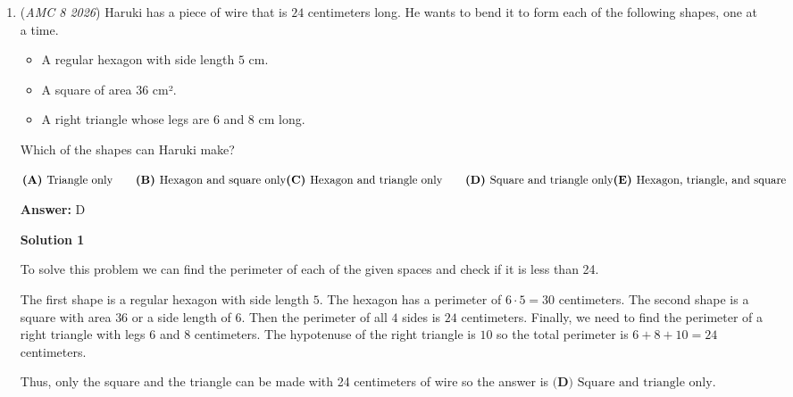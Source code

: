 \begin{enumerate}
 I suggest you try this with more arrays to possibly come up with an easier formula.

 


	\item (\textit{AMC 8 2026}) Haruki has a piece of wire that is $24$ centimeters long. He wants to bend it to form each of the following shapes, one at a time.


 
            \begin{itemize}
        \item A regular hexagon with side length $5$ cm.
            \end{itemize}
            
            \begin{itemize}
        \item A square of area $36$ cm².
            \end{itemize}
            
            \begin{itemize}
        \item A right triangle whose legs are $6$ and $8$ cm long.
            \end{itemize}
            Which of the shapes can Haruki make?


 $\textbf{(A) }\text{Triangle only} \qquad \textbf{(B) }\text{Hexagon and square only} \\  \textbf{(C) }\text{Hexagon and triangle only} \qquad \textbf{(D) }\text{Square and triangle only} \\ \textbf{(E) }\text{Hexagon, triangle, and square}$

 \textbf{Answer: }D



\textbf{Solution 1}

	To solve this problem we can find the perimeter of each of the given spaces and check if it is less than 24.

 The first shape is a regular hexagon with side length $5$. The hexagon has a perimeter of $6 \cdot 5 = 30$ centimeters. The second shape is a square with area $36$ or a side length of $6$. Then the perimeter of all $4$ sides is $24$ centimeters. Finally, we need to find the perimeter of a right triangle with legs $6$ and $8$ centimeters. The hypotenuse of the right triangle is $10$ so the total perimeter is $6 + 8 + 10 = 24$ centimeters.

 Thus, only the square and the triangle can be made with 24 centimeters of wire so the answer is $\boxed{\textbf {(D) } \text{Square and triangle only}}$.


\end{enumerate}
